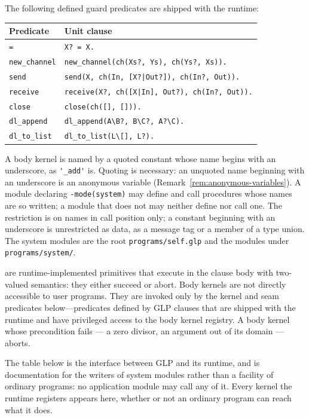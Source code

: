 The following defined guard predicates are shipped with the runtime:

\begin{center}
\begin{tabular}{ll}
\textbf{Predicate} & \textbf{Unit clause} \\
\hline
\verb|=| & \verb|X? = X.| \\
\verb|new_channel| & \verb|new_channel(ch(Xs?, Ys), ch(Ys?, Xs)).| \\
\verb|send| & \verb+send(X, ch(In, [X?|Out?]), ch(In?, Out)).+ \\
\verb|receive| & \verb+receive(X?, ch([X|In], Out?), ch(In?, Out)).+ \\
\verb|close| & \verb|close(ch([], [])).| \\
\verb|dl_append| & \verb|dl_append(A\B?, B\C?, A?\C).| \\
\verb|dl_to_list| & \verb|dl_to_list(L\[], L?).| \\
\end{tabular}
\end{center}

A body kernel is named by a quoted constant whose name begins with an underscore, as \verb|'_add'| is. Quoting is necessary: an unquoted name beginning with an underscore is an anonymous variable (Remark~\ref{rem:anonymous-variables}). A module declaring \verb|-mode(system)| may define and call procedures whose names are so written; a module that does not may neither define nor call one. The restriction is on names in call position only; a constant beginning with an underscore is unrestricted as data, as a message tag or a member of a type union. The system modules are the root \verb|programs/self.glp| and the modules under \verb|programs/system/|.

 are runtime-implemented primitives that execute in the clause body with two-valued semantics: they either succeed or abort. Body kernels are not directly accessible to user programs. They are invoked only by the kernel and seam predicates below---predicates defined by GLP clauses that are shipped with the runtime and have privileged access to the body kernel registry. A body kernel whose precondition fails --- a zero divisor, an argument out of its domain --- aborts.

The table below is the interface between GLP and its runtime, and is documentation for the writers of system modules rather than a facility of ordinary programs: no application module may call any of it. Every kernel the runtime registers appears here, whether or not an ordinary program can reach what it does.

